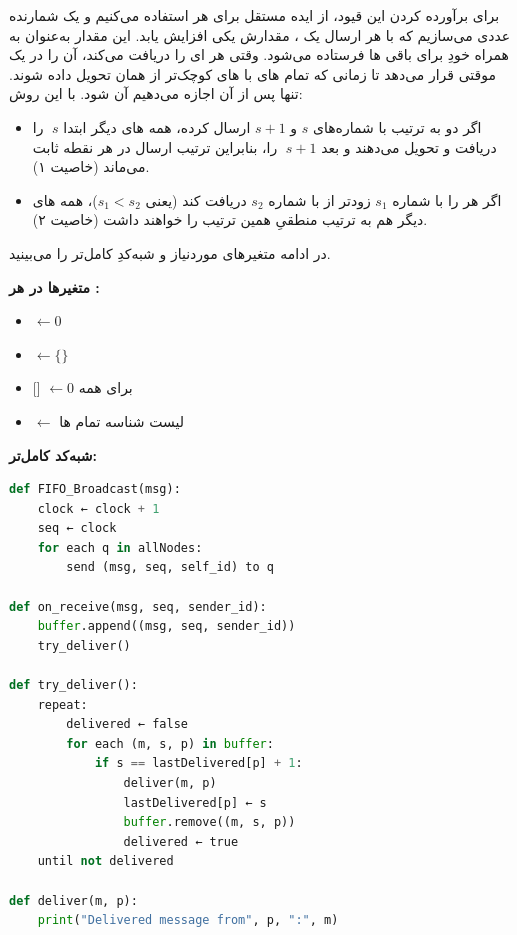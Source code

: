 برای برآورده کردن این قیود، از ایده  مستقل برای هر  استفاده می‌کنیم و یک شمارنده عددی می‌سازیم که با هر ارسال یک ، مقدارش یکی افزایش یابد. این مقدار به‌عنوان  به همراه خودِ  برای باقی ها فرستاده می‌شود. وقتی هر  ای را دریافت می‌کند، آن را در یک  موقتی قرار می‌دهد تا زمانی که تمام های با ‌های کوچک‌تر از همان  تحویل داده شوند. تنها پس از آن اجازه می‌دهیم آن   شود. با این روش:

\begin{itemize}
    \item اگر  دو  به ترتیب با شماره‌های \(s\) و \(s+1\) ارسال کرده، همه های دیگر ابتدا \(\;s\) را دریافت و تحویل می‌دهند و بعد \(\;s+1\) را، بنابراین ترتیب ارسال در هر نقطه ثابت می‌ماند (خاصیت ۱).  
    \item اگر  هر  را با شماره \(s_1\) زودتر از  با شماره \(s_2\) دریافت کند (یعنی \(s_1 < s_2\))، همه های دیگر هم به ترتیب منطقیِ  همین ترتیب را خواهند داشت (خاصیت ۲).  
\end{itemize}

در ادامه متغیرهای موردنیاز و شبه‌کدِ کامل‌تر را می‌بینید.

\bigskip

\noindent
\textbf{متغیرها در هر :}  
\begin{itemize}
    \item {} \(\leftarrow 0\)  
    \item {} \(\leftarrow \{\}\)  
    \item {}[] \(\leftarrow 0\) برای همه   
    \item {} \(\leftarrow\) لیست شناسه تمام ها  
\end{itemize}

\bigskip

\noindent
\textbf{شبه‌کد کامل‌تر:}

\begin{latin}
\begin{lstlisting}[language=Python]
def FIFO_Broadcast(msg):
    clock ← clock + 1
    seq ← clock
    for each q in allNodes:
        send (msg, seq, self_id) to q

def on_receive(msg, seq, sender_id):
    buffer.append((msg, seq, sender_id))
    try_deliver()

def try_deliver():
    repeat:
        delivered ← false
        for each (m, s, p) in buffer:
            if s == lastDelivered[p] + 1:
                deliver(m, p)
                lastDelivered[p] ← s
                buffer.remove((m, s, p))
                delivered ← true
    until not delivered

def deliver(m, p):
    print("Delivered message from", p, ":", m)
\end{lstlisting}
\end{latin}

